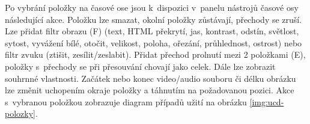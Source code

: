 Po vybrání položky na časové ose jsou k~dispozici v~panelu nástrojů časové osy následující akce. Položku lze smazat, okolní položky zůstávají, přechody se zruší. Lze přidat filtr obrazu (F) (text, HTML překrytí, jas, kontrast, odstín, světlost, sytost, vyvážení bílé, otočit, velikost, poloha, ořezání, průhlednost, ostrost) nebo filtr zvuku (ztišit, zesílit/zeslabit). Přidat přechod prolnutí mezi 2 položkami (E), položky s~přechody se při přesouvání chovají jako celek. Dále lze zobrazit souhrnné vlastnosti.
Začátek nebo konec video/audio souboru či délku obrázku lze změnit uchopením okraje položky a táhnutím na požadovanou pozici. Akce s~vybranou položkou zobrazuje diagram případů užití na obrázku \ref{img:ucd-polozky}.
